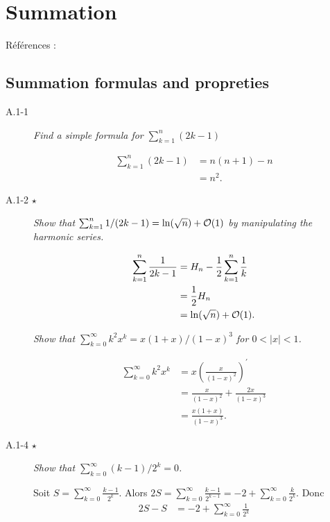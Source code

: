\section{Summation}

R\'ef\'erences : \cite{uic_hw1}

\subsection{Summation formulas and propreties}

\begin{description}
  \item [A.1-1] {\itshape Find a simple formula for $\sum_{k=1}^n(2k-1)$ }
   \begin{ex}
  \begin{align*}
    \sum_{k=1}^n(2k-1)  & = n(n+1)-n\\
    &= n^2.
  \end{align*}
\end{ex}
\item[A.1-2 $\star$]  {\itshape Show that $\sum_{k=1}^n1/(2k-1) = \ln (\sqrt{n}) + \mathcal{O}(1)$ by manipulating the harmonic series.}
    \begin{ex}
      \begin{align*}
        \sum_{k=1}^n \frac{1}{2k-1} &= H_n - \frac{1}{2}\sum_{k=1}^n\frac{1}{k}\\
       &= \frac{1}{2}H_n\\
       &= \ln(\sqrt{n}) + \mathcal{O}(1).
      \end{align*}
    \end{ex}
   {\itshape Show that $\sum_{k=0}^{\infty} k^2x^k = x(1+x)/(1-x)^3$ for $ 0 < |x| < 1$.}
    \begin{ex}
    \begin{align*}
  \sum_{k=0}^\infty k^2x^k & = x \left( \frac{x}{(1-x)^2} \right)^\prime\\
      &= \frac{x}{(1-x)^2}+\frac{2x}{(1-x)^3}\\
      &= \frac{x(1+x)}{(1-x)^3}.
    \end{align*}
  \end{ex}
\item[A.1-4 $\star$] {\itshape Show that $\sum^\infty_{k=0}(k-1)/2^k = 0$.}
    \begin{ex}
    Soit $S=\sum_{k=0}^\infty\frac{k-1}{2^k}$. Alors $2S = \sum_{k=0}^{\infty}\frac{k-1}{2^{k-1}}= -2 + \sum_{k=0}^\infty\frac{k}{2^k}$. Donc 
    \begin{align*}
      2S-S &= -2 + \sum_{k=0}^\infty\frac{1}{2^k}\\

\end{align*}
\end{ex}
\end{description}
